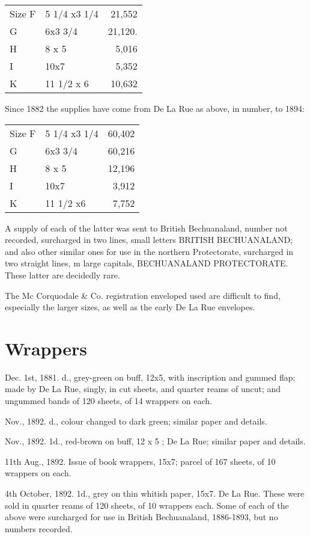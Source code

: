 \begin{tabular}{llr}
Size  F  &5 1/4 x3 1/4  & 21,552\\
 G    & 6x3 3/4       &21,120.\\
 H   & 8 x 5     & 5,016\\
 I   &10x7      & 5,352\\
 K   &11 1/2 x 6      & 10,632\\
\end{tabular}

Since 1882 the supplies have come from De La Rue as above, in number,
to 1894:

\begin{tabular}{llr}
Size F   &5 1/4 x3 1/4     &60,402\\
 G      & 6x3 3/4     &60,216\\
 H    & 8 x 5   &12,196\\
 I     & 10x7     & 3,912\\
 K     & 11 1/2 x6     & 7,752\\
\end{tabular}

A supply of each of the latter was sent to British Bechuanaland, number
not recorded, surcharged in two lines, small letters BRITISH BECHUANALAND; and
also other similar ones for use in the northern Protectorate, surcharged in
two straight lines, m large capitals, BECHUANALAND PROTECTORATE. These latter are
decidedly rare.

The Mc Corquodale & Co. registration enveloped used are difficult to find, especially the larger sizes, as well as the early De La Rue envelopes. 


\section{Wrappers}

Dec. 1st, 1881. \half d., grey-green on buff, 12x5, with inscription and
gummed flap; made by De La Rue, singly, in cut sheets, and quarter
reams of uncut; and ungummed bands of 120 sheets, of 14 wrappers on
each.

Nov., 1892. \half d., colour changed to dark green; similar paper and
details.

Nov., 1892. 1d., red-brown on buff, 12 x 5 ; De La Rue; similar paper
and details.

11th Aug., 1892. Issue of book wrappers, 15x7; parcel of 167 sheets,
of 10 wrappers on each.

4th October, 1892. 1\half d., grey on thin whitish paper, 15x7. De La
Rue. These were sold in quarter reams of 120 sheets, of 10 wrappers each.
Some of each of the above were surcharged for use in British Bechuanaland,
1886-1893, but no numbers recorded.









